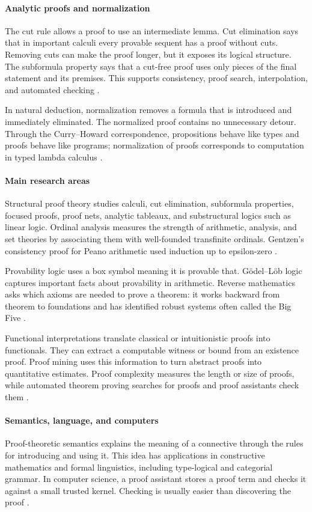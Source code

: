 \paragraph{Analytic proofs and normalization}
The cut rule allows a proof to use an intermediate lemma. Cut elimination says that in important calculi every provable sequent has a proof without cuts. Removing cuts can make the proof longer, but it exposes its logical structure. The subformula property says that a cut-free proof uses only pieces of the final statement and its premises. This supports consistency, proof search, interpolation, and automated checking \cite{proof_ref2,proof_ref4}.

In natural deduction, normalization removes a formula that is introduced and immediately eliminated. The normalized proof contains no unnecessary detour. Through the Curry--Howard correspondence, propositions behave like types and proofs behave like programs; normalization of proofs corresponds to computation in typed lambda calculus \cite{proof_ref4}.

\paragraph{Main research areas}
Structural proof theory studies calculi, cut elimination, subformula properties, focused proofs, proof nets, analytic tableaux, and substructural logics such as linear logic. Ordinal analysis measures the strength of arithmetic, analysis, and set theories by associating them with well-founded transfinite ordinals. Gentzen's consistency proof for Peano arithmetic used induction up to epsilon-zero \cite{proof_ref1}.

Provability logic uses a box symbol meaning it is provable that. Gödel--Löb logic captures important facts about provability in arithmetic. Reverse mathematics asks which axioms are needed to prove a theorem: it works backward from theorem to foundations and has identified robust systems often called the Big Five \cite{proof_ref3}.

Functional interpretations translate classical or intuitionistic proofs into functionals. They can extract a computable witness or bound from an existence proof. Proof mining uses this information to turn abstract proofs into quantitative estimates. Proof complexity measures the length or size of proofs, while automated theorem proving searches for proofs and proof assistants check them \cite{proof_ref1,proof_ref5}.

\paragraph{Semantics, language, and computers}
Proof-theoretic semantics explains the meaning of a connective through the rules for introducing and using it. This idea has applications in constructive mathematics and formal linguistics, including type-logical and categorial grammar. In computer science, a proof assistant stores a proof term and checks it against a small trusted kernel. Checking is usually easier than discovering the proof \cite{proof_ref4}.

